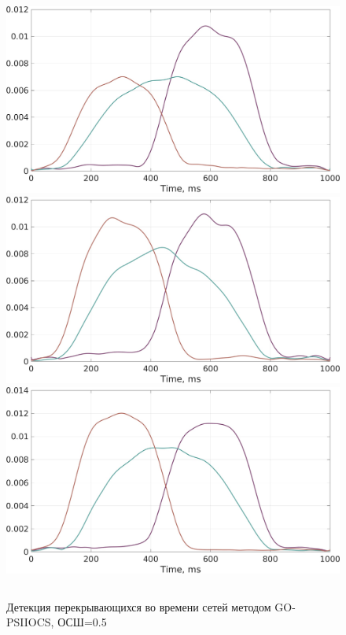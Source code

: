\documentclass[12pt]{beamer}
\begin{document}
\begin{frame}[t]
\begin{figure}[htbp]
\begin{columns}
\begin{column}{0.39\textwidth}
        \includegraphics[width=0.7\linewidth]{../images/timeseries_gopsiicos.jpg}
        \includegraphics[width=0.7\linewidth]{../images/timeseries_gopsiicos_pi4.jpg}
        \includegraphics[width=0.7\linewidth]{../images/timeseries_gopsiicos_pi2pi20.jpg}
    \end{column}
    \centering
\end{columns}
{\footnotesize Детекция перекрывающихся во времени сетей методом GO-PSIIOCS, ОСШ=0.5}
\end{figure}
\end{frame}
\end{document}
